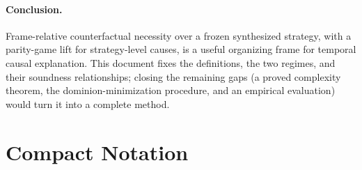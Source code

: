 \documentclass[11pt]{article}
\theoremstyle{remark}
\begin{document}
\paragraph{Conclusion.} Frame-relative counterfactual necessity over a frozen
synthesized strategy, with a parity-game lift for strategy-level causes, is a
useful organizing frame for temporal causal explanation. This document fixes the
definitions, the two regimes, and their soundness relationships; closing the
remaining gaps (a proved complexity theorem, the dominion-minimization procedure,
and an empirical evaluation) would turn it into a complete method.

\appendix

\section{Compact Notation}
\label{app:symbols}
\end{document}
